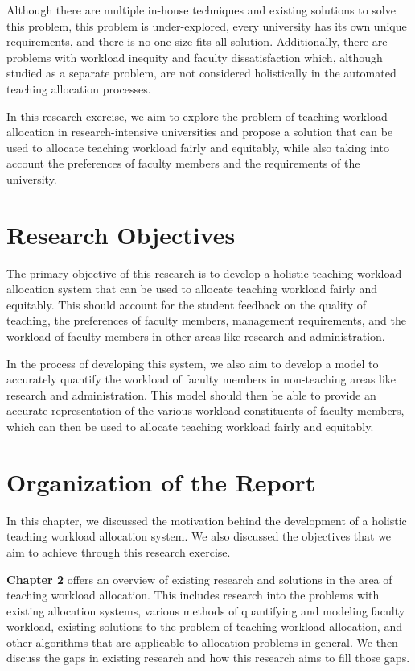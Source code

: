 Although there are multiple in-house techniques and existing solutions to solve this problem, this problem is under-explored, every university has its own unique requirements, and there is no one-size-fits-all solution. Additionally, there are problems with workload inequity and faculty dissatisfaction which, although studied as a separate problem, are not considered holistically in the automated teaching allocation processes.

In this research exercise, we aim to explore the problem of teaching workload allocation in research-intensive universities and propose a solution that can be used to allocate teaching workload fairly and equitably, while also taking into account the preferences of faculty members and the requirements of the university.

\section{Research Objectives}

The primary objective of this research is to develop a holistic teaching workload allocation system that can be used to allocate teaching workload fairly and equitably. This should account for the student feedback on the quality of teaching, the preferences of faculty members, management requirements, and the workload of faculty members in other areas like research and administration.

In the process of developing this system, we also aim to develop a model to accurately quantify the workload of faculty members in non-teaching areas like research and administration. This model should then be able to provide an accurate representation of the various workload constituents of faculty members, which can then be used to allocate teaching workload fairly and equitably.

\section{Organization of the Report}

In this chapter, we discussed the motivation behind the development of a holistic teaching workload allocation system. We also discussed the objectives that we aim to achieve through this research exercise.

\textbf{Chapter 2} offers an overview of existing research and solutions in the area of teaching workload allocation. This includes research into the problems with existing allocation systems, various methods of quantifying and modeling faculty workload, existing solutions to the problem of teaching workload allocation, and other algorithms that are applicable to allocation problems in general. We then discuss the gaps in existing research and how this research aims to fill those gaps.


